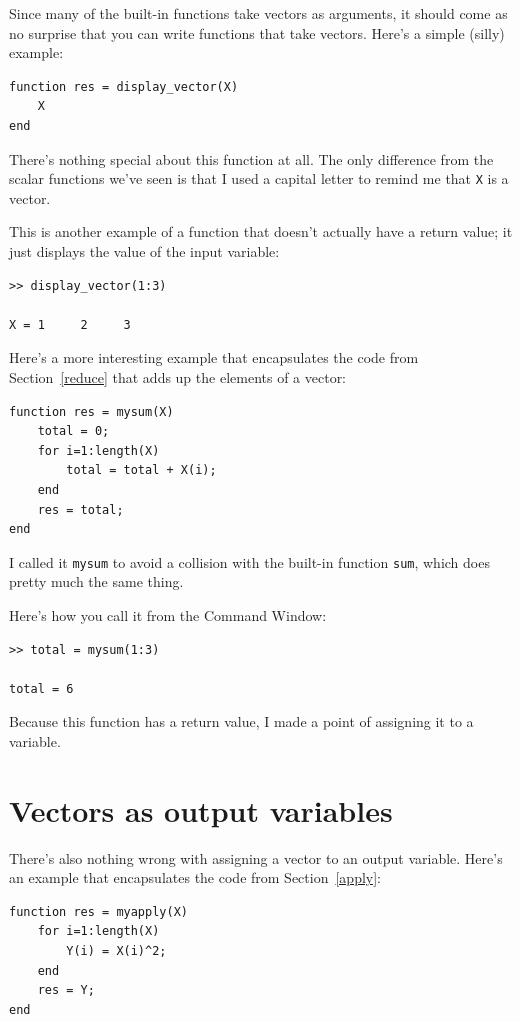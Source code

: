 \documentclass{book}
\begin{document}
Since many of the built-in functions take vectors as arguments,
it should come as no surprise that you can write functions that
take vectors.  Here's a simple (silly) example:

\begin{verbatim}
function res = display_vector(X)
    X
end
\end{verbatim}

There's nothing special about this function at all.  The only
difference from the scalar functions we've seen is that I used
a capital letter to remind me that {\tt X} is a vector.

This is another example of a function that doesn't actually have
a return value; it just displays the value of the input variable:

\begin{verbatim}
>> display_vector(1:3)

X = 1     2     3
\end{verbatim}

Here's a more interesting example that encapsulates the code
from Section~\ref{reduce} that adds up the elements of a vector:

\begin{verbatim}
function res = mysum(X)
    total = 0;
    for i=1:length(X)
        total = total + X(i);
    end
    res = total;
end
\end{verbatim}

I called it {\tt mysum} to avoid a collision with the built-in
function {\tt sum}, which does pretty much the same thing.

Here's how you call it from the Command Window:

\begin{verbatim}
>> total = mysum(1:3)

total = 6
\end{verbatim}

Because this function has a return value, I made a
point of assigning it to a variable.


\section{Vectors as output variables}

There's also nothing wrong with assigning a vector to an output
variable.  Here's an example that encapsulates the code from
Section~\ref{apply}:

\begin{verbatim}
function res = myapply(X)
    for i=1:length(X)
        Y(i) = X(i)^2;
    end
    res = Y;
end
\end{verbatim}
\end{document}
